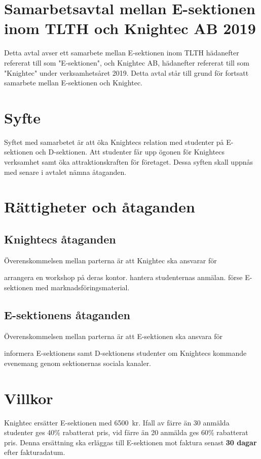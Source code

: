 \documentclass[10pt]{article}
\def\year{2019}
\def\doctitle{Samarbetsavtal mellan E-sektionen inom TLTH och Knightec AB  {\year}}
\begin{document}
        \section*{\doctitle}
        Detta avtal avser ett samarbete mellan E-sektionen inom TLTH hädanefter refererat till som "E-sektionen", och Knightec AB, hädanefter refererat till som "Knightec" under verksamhetsåret 2019. Detta avtal står till grund för fortsatt samarbete mellan E-sektionen och Knightec.
\\
        \section{Syfte}
        Syftet med samarbetet är att öka Knightecs relation med studenter på E-sektionen och D-sektionen. Att studenter får upp ögonen för Knightecs verksamhet samt öka attraktionskraften för företaget. Dessa syften skall uppnås med senare i avtalet
nämna åtaganden.


        \section{Rättigheter och åtaganden}
        \subsection{Knightecs åtaganden}
        Överenskommelsen mellan parterna är att Knightec ska ansvarar för

        \begin{attsatser}
            \att arrangera en workshop på deras kontor.
            \att hantera studenternas anmälan.
            \att förse E-sektionen med marknadsföringsmaterial. 


               \end{attsatser}

        \subsection{E-sektionens åtaganden}
        Överenskommelsen mellan parterna är att E-sektionen ska ansvara för
        \begin{attsatser}
            \att informera E-sektionens samt D-sektionens studenter om Knightecs kommande evenemang genom sektionernas sociala kanaler. 
        \end{attsatser}
        
        \section{Villkor}
        Knightec ersätter E-sektionen med \SI{6500}{kr}. Ifall av färre än 30 anmälda studenter ges 40\% rabatterat pris, vid färre än 20 anmälda ges 60\% rabatterat pris. Denna ersättning ska erläggas till E-sektionen mot faktura senast \textbf{30 dagar} efter fakturadatum.
        \newline
\end{document}
